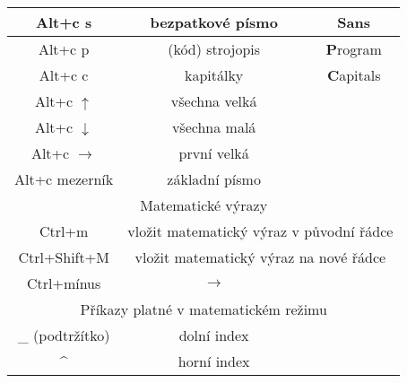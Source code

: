 \begin{flushleft}
\begin{longtable}{|c|c|c|}
\hline 
Alt+c s & bezpatkové písmo & \textbf{S}ans\tabularnewline
\hline 
Alt+c p & (kód) strojopis & \textbf{P}rogram\tabularnewline
\hline 
Alt+c c & kapitálky & \textbf{C}apitals\tabularnewline
\hline 
Alt+c $\uparrow$ & všechna velká & \tabularnewline
\hline 
Alt+c $\downarrow$ & všechna malá & \tabularnewline
\hline 
Alt+c $\rightarrow$ & první velká & \tabularnewline
\hline 
Alt+c mezerník & základní písmo & \tabularnewline
\hline
\hline 
\multicolumn{3}{|c|}{\textsf{Matematické výrazy}}\tabularnewline
\hline
\hline 
Ctrl+m & \multicolumn{2}{c|}{vložit matematický výraz v původní řádce }\tabularnewline
\hline 
Ctrl+Shift+M & \multicolumn{2}{c|}{vložit matematický výraz na nové řádce}\tabularnewline
\hline 
Ctrl+mínus & $\rightarrow$ & \tabularnewline
\hline
\hline 
\multicolumn{3}{|c|}{\textsf{Příkazy platné v matematickém režimu}}\tabularnewline
\hline
\hline 
\_ (podtržítko) & dolní index & \tabularnewline
\hline 
\textasciicircum{} & horní index & \tabularnewline
\hline
\end{longtable}
\par\end{flushleft}
